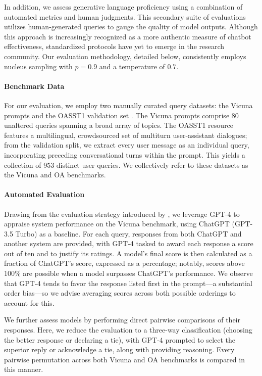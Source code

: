 In addition, we assess generative language proficiency using a combination of automated metrics and human judgments. This secondary suite of evaluations utilizes human-generated queries to gauge the quality of model outputs. Although this approach is increasingly recognized as a more authentic measure of chatbot effectiveness, standardized protocols have yet to emerge in the research community. Our evaluation methodology, detailed below, consistently employs nucleus sampling with $p=0.9$ and a temperature of $0.7$.

\paragraph{Benchmark Data} For our evaluation, we employ two manually curated query datasets: the Vicuna prompts \citep{vicuna2023} and the OASST1 validation set \citep{kopf2023openassistant}. The Vicuna prompts comprise 80 unaltered queries spanning a broad array of topics. The OASST1 resource features a multilingual, crowdsourced set of multiturn user-assistant dialogues; from the validation split, we extract every user message as an individual query, incorporating preceding conversational turns within the prompt. This yields a collection of 953 distinct user queries. We collectively refer to these datasets as the Vicuna and OA benchmarks.

\paragraph{Automated Evaluation} Drawing from the evaluation strategy introduced by \citet{vicuna2023}, we leverage GPT-4 to appraise system performance on the Vicuna benchmark, using ChatGPT (GPT-3.5 Turbo) as a baseline. For each query, responses from both ChatGPT and another system are provided, with GPT-4 tasked to award each response a score out of ten and to justify its ratings. A model’s final score is then calculated as a fraction of ChatGPT’s score, expressed as a percentage; notably, scores above 100\% are possible when a model surpasses ChatGPT’s performance. We observe that GPT-4 tends to favor the response listed first in the prompt—a substantial order bias—so we advise averaging scores across both possible orderings to account for this.

We further assess models by performing direct pairwise comparisons of their responses. Here, we reduce the evaluation to a three-way classification (choosing the better response or declaring a tie), with GPT-4 prompted to select the superior reply or acknowledge a tie, along with providing reasoning. Every pairwise permutation across both Vicuna and OA benchmarks is compared in this manner.

